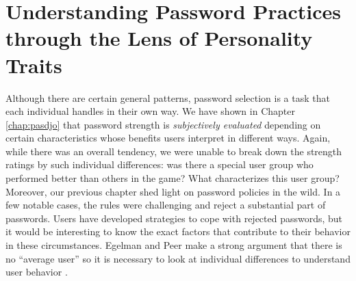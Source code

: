 \chapter[Password Personality]{Understanding Password Practices through the Lens of Personality Traits}\label{chap:pws_and_personality}

Although there are certain general patterns, password selection is a task that each individual handles in their own way. 
We have shown in Chapter \ref{chap:pasdjo} that password strength is \textit{subjectively evaluated} depending on certain characteristics whose benefits users interpret in different ways. Again, while there was an overall tendency, we were unable to break down the strength ratings by such individual differences: was there a special user group who performed better than others in the game? What characterizes this user group? Moreover, our previous chapter shed light on password policies in the wild. In a few notable cases, the rules were challenging and reject a substantial part of passwords. Users have developed strategies to cope with rejected passwords, but it would be interesting to know the exact factors that contribute to their behavior in these circumstances. Egelman and Peer make a strong argument that there is no ``average user'' so it is necessary to look at individual differences to understand user behavior \cite{Egelman2015AverageUser}. 

